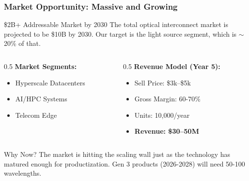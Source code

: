 \documentclass{beamer}
\begin{document}
\begin{frame}
    \frametitle{Market Opportunity: Massive and Growing}
    
    \begin{block}{\$2B+ Addressable Market by 2030}
        The total optical interconnect market is projected to be \$10B by 2030. Our target is the light source segment, which is $\sim$20\% of that.
    \end{block}
    
    \begin{columns}[T]
        \begin{column}{0.5\textwidth}
            \textbf{Market Segments:}
            \begin{itemize}
                \item Hyperscale Datacenters
                \item AI/HPC Systems
                \item Telecom Edge
            \end{itemize}
        \end{column}
        \begin{column}{0.5\textwidth}
            \textbf{Revenue Model (Year 5):}
            \begin{itemize}
                \item Sell Price: \$3k--\$5k
                \item Gross Margin: 60-70\%
                \item Units: 10,000/year
                \item \textbf{Revenue: \$30--50M}
            \end{itemize}
        \end{column}
    \end{columns}
    
    \begin{exampleblock}{Why Now?}
        The market is hitting the scaling wall just as the technology has matured enough for productization. Gen 3 products (2026-2028) will need 50-100 wavelengths.
    \end{exampleblock}
\end{frame}
\end{document}
